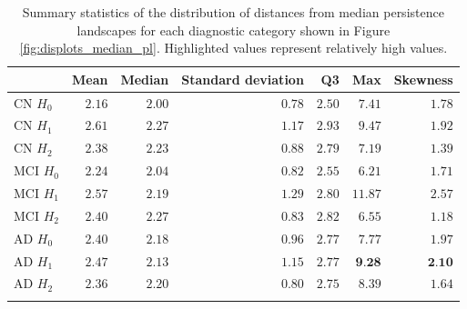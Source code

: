\documentclass{article}
\begin{document}
\begin{table}
\centering
\begin{tabular}{lrrrrrr}
  \toprule {} & Mean & Median & Standard deviation & Q3 & Max & Skewness \\
  \midrule CN $H_0$ & $2.16$ & $2.00$ & $0.78$ & $2.50$ & $7.41$ & $1.78$ \\
  CN $H_1$ & $2.61$ & $2.27$ & $1.17$ & $2.93$ & $9.47$ & $1.92$ \\
  CN $H_2$ & $2.38$ & $2.23$ & $0.88$ & $2.79$ & $7.19$ & $1.39$ \\
  MCI $H_0$ & $2.24$ & $2.04$ & $0.82$ & $2.55$ & $6.21$ & $1.71$ \\
  MCI $H_1$ & $2.57$ & $2.19$ & $1.29$ & $2.80$ & $\mathbf{11.87}$ & $\mathbf{2.57}$ \\
  MCI $H_2$ & $2.40$ & $2.27$ & $0.83$ & $2.82$ & $6.55$ & $1.18$ \\
  AD $H_0$ & $2.40$ & $2.18$ & $0.96$ & $2.77$ & $7.77$ & $1.97$ \\
  AD $H_1$ & $2.47$ & $2.13$ & $1.15$ & $2.77$ & $\textbf{9.28}$ & $\textbf{2.10}$ \\
  AD $H_2$ & $2.36$ & $2.20$ & $0.80$ & $2.75$ & $8.39$ & $1.64$ \\
  \bottomrule
  \vspace{1pt}
\end{tabular}
\caption{Summary statistics of the distribution of distances from median persistence landscapes for
each diagnostic category shown in Figure \ref{fig:displots_median_pl}. Highlighted values represent
relatively high values.}
\label{tab:stats_median_pl}
\end{table}
\end{document}
